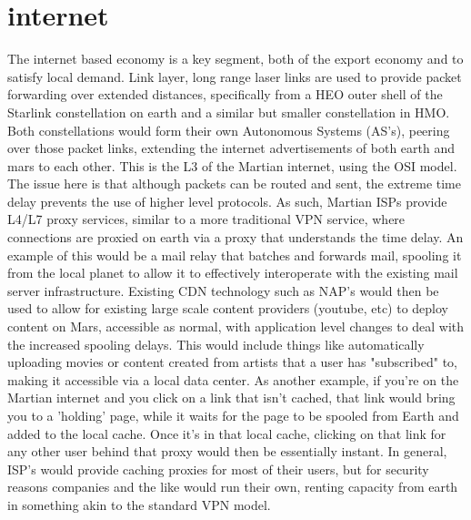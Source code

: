 \documentclass[10pt]{article}
\begin{document}
\section{internet}
The internet based economy is a key segment, both of the export economy and to satisfy local demand. Link layer, long range laser links are used to provide packet forwarding over extended distances, specifically from a HEO outer shell of the Starlink constellation on earth and a similar but smaller constellation in HMO. Both constellations would form their own Autonomous Systems (AS's), peering over those packet links, extending the internet advertisements of both earth and mars to each other. This is the L3 of the Martian internet, using the OSI model. The issue here is that although packets can be routed and sent, the extreme time delay prevents the use of higher level protocols. As such, Martian ISPs provide L4/L7 proxy services, similar to a more traditional VPN service, where connections are proxied on earth via a proxy that understands the time delay. An example of this would be a mail relay that batches and forwards mail, spooling it from the local planet to allow it to effectively interoperate with the existing mail server infrastructure. Existing CDN technology such as NAP's would then be used to allow for existing large scale content providers (youtube, etc) to deploy content on Mars, accessible as normal, with application level changes to deal with the increased spooling delays. This would include things like automatically uploading movies or content created from artists that a user has "subscribed" to, making it accessible via a local data center. As another example, if you're on the Martian internet and you click on a link that isn't cached, that link would bring you to a 'holding' page, while it waits for the page to be spooled from Earth and added to the local cache. Once it's in that local cache, clicking on that link for any other user behind that proxy would then be essentially instant. In general, ISP's would provide caching proxies for most of their users, but for security reasons companies and the like would run their own, renting capacity from earth in something akin to the standard VPN model.
\end{document}
